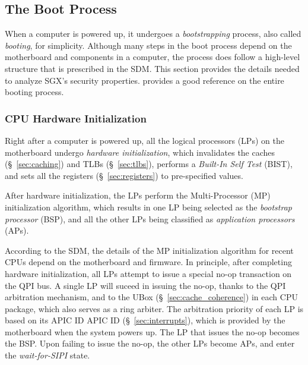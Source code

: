 \subsection{The Boot Process}
\label{sec:booting}

When a computer is powered up, it undergoes a \textit{bootstrapping} process,
also called \textit{booting}, for simplicity. Although many steps in the boot
process depend on the motherboard and components in a computer, the process
does follow a high-level structure that is prescribed in the SDM. This section
provides the details needed to analyze SGX's security properties.
\cite{intel2010booting} provides a good reference on the entire booting
process.

\subsubsection{CPU Hardware Initialization}


Right after a computer is powered up, all the logical processors (LPs) on the
motherboard undergo \textit{hardware initialization}, which invalidates the
caches (\S~\ref{sec:caching}) and TLBs (\S~\ref{sec:tlbs}), performs a
\textit{Built-In Self Test} (BIST), and sets all the registers
(\S~\ref{sec:registers}) to pre-specified values.


After hardware initialization, the LPs perform the Multi-Processor (MP)
initialization algorithm, which results in one LP being selected as the
\textit{bootstrap processor} (BSP), and all the other LPs being classified as
\textit{application processors} (APs).

According to the SDM, the details of the MP initialization algorithm for recent
CPUs depend on the motherboard and firmware. In principle, after completing
hardware initialization, all LPs attempt to issue a special no-op transaction
on the QPI bus. A single LP will suceed in issuing the no-op, thanks to
the QPI arbitration mechanism, and to the UBox (\S~\ref{sec:cache_coherence})
in each CPU package, which also serves as a ring arbiter. The arbitration
priority of each LP is based on its APIC ID APIC ID (\S~\ref{sec:interrupts}),
which is provided by the motherboard when the system powers up. The LP that
issues the no-op becomes the BSP. Upon failing to issue the no-op, the other
LPs become APs, and enter the \textit{wait-for-SIPI} state.

